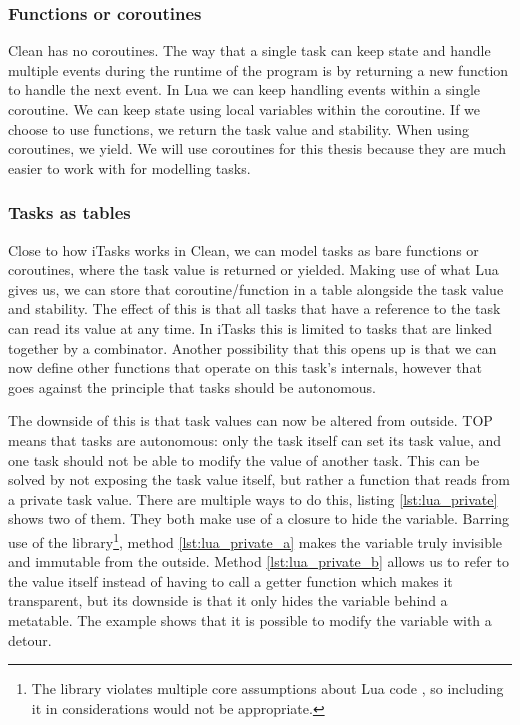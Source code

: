 \subsubsection{Functions or coroutines}
Clean has no coroutines. The way that a single task can keep state and handle multiple events during the runtime of the program is by returning a new function to handle the next event. In Lua we can keep handling events within a single coroutine. We can keep state using local variables within the coroutine. If we choose to use functions, we return the task value and stability. When using coroutines, we yield. We will use coroutines for this thesis because they are much easier to work with for modelling tasks.

\subsubsection{Tasks as tables}
Close to how iTasks works in Clean, we can model tasks as bare functions or coroutines, where the task value is returned or yielded. Making use of what Lua gives us, we can store that coroutine/function in a table alongside the task value and stability. The effect of this is that all tasks that have a reference to the task can read its value at any time. In iTasks this is limited to tasks that are linked together by a combinator. Another possibility that this opens up is that we can now define other functions that operate on this task's internals, however that goes against the principle that tasks should be autonomous.

The downside of this is that task values can now be altered from outside. TOP means that tasks are autonomous: only the task itself can set its task value, and one task should not be able to modify the value of another task. This can be solved by not exposing the task value itself, but rather a function that reads from a private task value. There are multiple ways to do this, listing \ref{lst:lua_private} shows two of them. They both make use of a closure to hide the variable. Barring use of the  library\footnote{The  library violates multiple core assumptions about Lua code \cite{luareferencemanual}, so including it in considerations would not be appropriate.}, method \ref{lst:lua_private_a} makes the  variable truly invisible and immutable from the outside. Method \ref{lst:lua_private_b} allows us to refer to the value itself instead of having to call a getter function which makes it transparent, but its downside is that it only hides the  variable behind a metatable. The example shows that it is possible to modify the variable with a detour.

